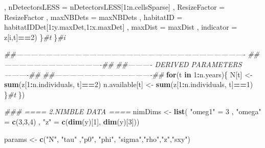 \documentclass[
]{article}
\newenvironment{Shaded}{\begin{snugshade}}{\end{snugshade}}
\newcommand{\CommentTok}[1]{\textcolor[rgb]{0.56,0.35,0.01}{\textit{#1}}}
\newcommand{\ControlFlowTok}[1]{\textcolor[rgb]{0.13,0.29,0.53}{\textbf{#1}}}
\newcommand{\DataTypeTok}[1]{\textcolor[rgb]{0.13,0.29,0.53}{#1}}
\newcommand{\DecValTok}[1]{\textcolor[rgb]{0.00,0.00,0.81}{#1}}
\newcommand{\KeywordTok}[1]{\textcolor[rgb]{0.13,0.29,0.53}{\textbf{#1}}}
\newcommand{\NormalTok}[1]{#1}
\newcommand{\OperatorTok}[1]{\textcolor[rgb]{0.81,0.36,0.00}{\textbf{#1}}}
\newcommand{\StringTok}[1]{\textcolor[rgb]{0.31,0.60,0.02}{#1}}
\begin{document}
\begin{Shaded}
\begin{Highlighting}[]
\NormalTok{            , }\DataTypeTok{nDetectorsLESS =}\NormalTok{ nDetectorsLESS[}\DecValTok{1}\OperatorTok{:}\NormalTok{n.cellsSparse]}
\NormalTok{            , }\DataTypeTok{ResizeFactor =}\NormalTok{ ResizeFactor}
\NormalTok{            , }\DataTypeTok{maxNBDets =}\NormalTok{ maxNBDets}
\NormalTok{            , }\DataTypeTok{habitatID =}\NormalTok{ habitatIDDet[}\DecValTok{1}\OperatorTok{:}\NormalTok{y.maxDet,}\DecValTok{1}\OperatorTok{:}\NormalTok{x.maxDet]}
\NormalTok{            , }\DataTypeTok{maxDist =}\NormalTok{ maxDist}
\NormalTok{            , }\DataTypeTok{indicator =}\NormalTok{ z[i,t]}\OperatorTok{==}\DecValTok{2}\NormalTok{)}
\NormalTok{    \}}\CommentTok{#t}
\NormalTok{  \}}\CommentTok{#i}

  
  \CommentTok{##----------------------------------------------------------------------------------------------                                        }
  \CommentTok{##----------------------------------------## }
  \CommentTok{##---------- DERIVED PARAMETERS ----------##}
  \CommentTok{##----------------------------------------##}
  \ControlFlowTok{for}\NormalTok{(t }\ControlFlowTok{in} \DecValTok{1}\OperatorTok{:}\NormalTok{n.years)\{}
\NormalTok{    N[t] <-}\StringTok{ }\KeywordTok{sum}\NormalTok{(z[}\DecValTok{1}\OperatorTok{:}\NormalTok{n.individuals, t]}\OperatorTok{==}\DecValTok{2}\NormalTok{) }
\NormalTok{    n.available[t] <-}\StringTok{ }\KeywordTok{sum}\NormalTok{(z[}\DecValTok{1}\OperatorTok{:}\NormalTok{n.individuals, t]}\OperatorTok{==}\DecValTok{1}\NormalTok{)}
\NormalTok{  \}}\CommentTok{#t}
\NormalTok{\}) }

\CommentTok{### ==== 2.NIMBLE DATA ====  }
\NormalTok{nimDims <-}\StringTok{ }\KeywordTok{list}\NormalTok{(  }\StringTok{"omeg1"}\NormalTok{ =}\StringTok{ }\DecValTok{3}
\NormalTok{                  , }\StringTok{"omega"}\NormalTok{ =}\StringTok{ }\KeywordTok{c}\NormalTok{(}\DecValTok{3}\NormalTok{,}\DecValTok{3}\NormalTok{,}\DecValTok{4}\NormalTok{)}
\NormalTok{                  , }\StringTok{"z"}\NormalTok{ =}\StringTok{ }\KeywordTok{c}\NormalTok{(}\KeywordTok{dim}\NormalTok{(y)[}\DecValTok{1}\NormalTok{], }\KeywordTok{dim}\NormalTok{(y)[}\DecValTok{3}\NormalTok{]))}

\NormalTok{params <-}\StringTok{ }\KeywordTok{c}\NormalTok{(}\StringTok{"N"}\NormalTok{, }\StringTok{"tau"}
\NormalTok{            ,}\StringTok{"p0"}\NormalTok{, }\StringTok{"phi"}\NormalTok{, }\StringTok{"sigma"}\NormalTok{,}\StringTok{"rho"}\NormalTok{,}\StringTok{"z"}\NormalTok{,}\StringTok{"sxy"}\NormalTok{) }



\end{Highlighting}
\end{Shaded}
\end{document}
